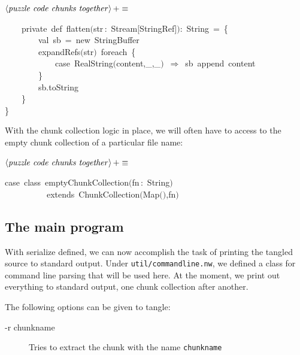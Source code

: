 \documentclass[a4paper,12pt]{article}
\begin{document}
$\left<\mbox{\emph{puzzle code chunks together}}\right>+\equiv$
\begin{program}~~~~{\vem private}~{\vem def}~flatten$($str\,{\rm :}~Stream$[$StringRef$]$$)${\rm :}~String~=~{\small\{}
\\~~~~~~~~{\vem val}~sb~=~{\vem new}~StringBuffer
\\~~~~~~~~expandRefs$($str$)$~foreach~{\small\{}
\\~~~~~~~~~~~~{\vem case}~RealString$($content,\_,\_$)$~$\Rightarrow$~sb~append~content
\\~~~~~~~~{\small\}}
\\~~~~~~~~sb.toString
\\~~~~{\small\}}
\\{\small\}}
\\[0.5em]\end{program}



With the chunk collection logic in place, we will often have to access
to the empty chunk collection of a particular file name:

$\left<\mbox{\emph{puzzle code chunks together}}\right>+\equiv$
\begin{program}{\vem case}~{\vem class}~emptyChunkCollection$($fn\,{\rm :}~String$)$
\\~~~~~~~~~~{\vem extends}~ChunkCollection$($Map$($$)$,fn$)$
\\[0.5em]\end{program}



 \subsection{The main program}
With serialize defined, we can now accomplish the task of printing
the tangled source to standard output. Under \texttt{util/commandline.nw},
we defined a class for command line parsing that will be used here.
At the moment, we print out everything to standard output, one chunk
collection after another.

The following options can be given to tangle:

\begin{description}
\item[-r chunkname] Tries to extract the chunk with the name \texttt{chunkname}
\end{description}
\end{document}

